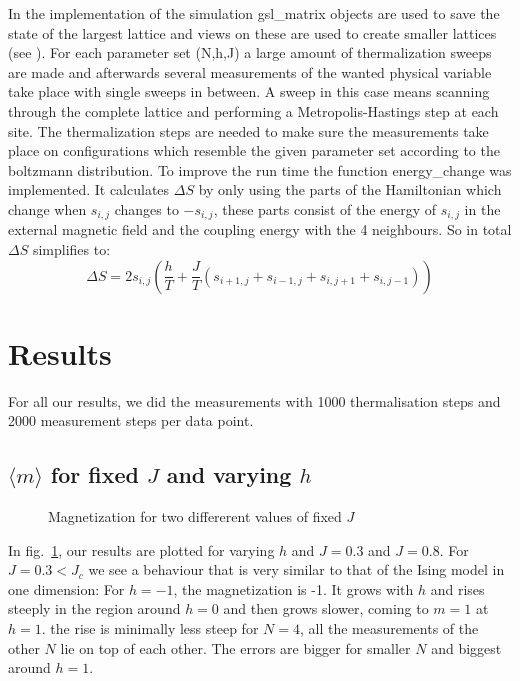 \documentclass{scrartcl}
\begin{document}
In the implementation of the simulation gsl\_matrix objects are used to save the state of the largest lattice and views on these are used to create smaller lattices (see \cite{gsldoc_mat}). For each parameter set (N,h,J) a large amount of thermalization sweeps are made and afterwards several measurements of the wanted physical variable take place with single sweeps in between. A sweep in this case means scanning through the complete lattice and performing a Metropolis-Hastings step at each site. The thermalization steps are needed to make sure the measurements take place on configurations which resemble the given parameter set according to the boltzmann distribution. To improve the run time the function energy\_change was implemented. It calculates $\Delta S$ by only using the parts of the Hamiltonian which change when $s_{i,j}$ changes to $-s_{i,j}$, these parts consist of the energy of $s_{i,j}$ in the external magnetic field and the coupling energy with the 4 neighbours.
So in total $\Delta S$ simplifies to:
\begin{equation}
	\Delta S=2 s_{i,j}\left(\dfrac{h}{T}+\dfrac{J}{T}(s_{i+1,j}+s_{i-1,j}+s_{i,j+1}+s_{i,j-1})\right)
\end{equation}


\section{Results}

For all our results, we did the measurements with 1000 thermalisation steps and 2000 measurement steps per data point.

\subsection{$\langle m\rangle$ for fixed $J$ and varying $h$}

\begin{figure}[htbp]
	
	\caption{Magnetization for two differerent values of fixed $J$}
	\label{fig:magfixJ}
\end{figure}

In fig.~\ref{fig:magfixJ}, our results are plotted for varying $h$ and $J=0.3$ and $J=0.8$. For $J=0.3<J_c$ we see a behaviour that is very similar to that of the Ising model in one dimension: For $h=-1$, the magnetization is -1. It grows with $h$ and rises steeply in the region around $h=0$ and then grows slower, coming to $m=1$ at $h=1$. the rise is minimally less steep for $N=4$, all the measurements of the other $N$ lie on top of each other. The errors are bigger for smaller $N$ and biggest around $h=1$.
 
\end{document}
